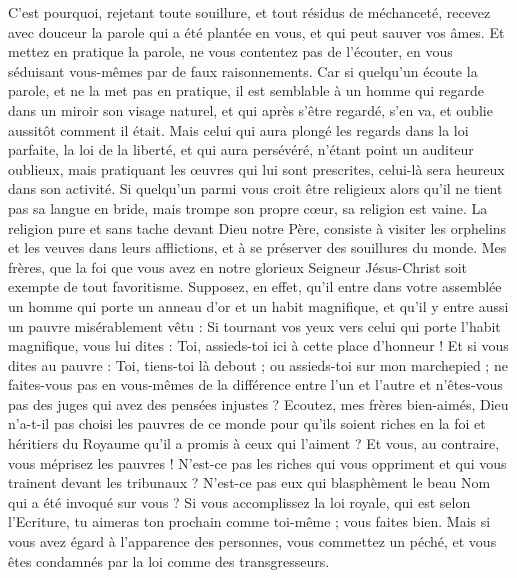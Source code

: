 \begin{multicols}{2}
C'est pourquoi, rejetant toute souillure, et tout résidus{} de méchanceté, recevez avec douceur la parole qui a été plantée en vous, et qui peut sauver vos âmes.
Et mettez en pratique la parole, ne vous contentez pas de l'écouter, en vous séduisant vous-mêmes par de faux raisonnements.
Car si quelqu'un écoute la parole, et ne la met pas en pratique, il est semblable à un homme qui regarde dans un miroir son visage naturel,
et qui après s'être regardé, s'en va, et oublie aussitôt comment il était.
Mais celui qui aura plongé les regards dans la loi parfaite, la loi de la liberté, et qui aura persévéré, n'étant point un auditeur oublieux, mais pratiquant les œuvres qui lui sont prescrites, celui-là sera heureux dans son activité.
Si quelqu'un parmi vous croit être religieux alors qu’il ne tient pas sa langue en bride, mais trompe son propre cœur, sa religion est vaine.
La religion pure et sans tache devant Dieu notre Père, consiste à visiter les orphelins et les veuves dans leurs afflictions, et à se préserver des souillures du monde.
\VerseOne{}Mes frères, que la foi que vous avez en notre glorieux Seigneur Jésus-Christ soit exempte de tout favoritisme.
Supposez, en effet, qu’il entre dans votre assemblée un homme qui porte un anneau d'or et un habit magnifique, et qu’il y entre aussi un pauvre misérablement vêtu :
Si tournant vos yeux vers celui qui porte l’habit magnifique, vous lui dites : Toi, assieds-toi ici à cette place d’honneur ! Et si vous dites au pauvre : Toi, tiens-toi là debout ; ou assieds-toi sur mon marchepied ;
ne faites-vous pas en vous-mêmes de la différence entre l’un et l’autre et n'êtes-vous pas des juges qui avez des pensées injustes ?
Ecoutez, mes frères bien-aimés, Dieu n'a-t-il pas choisi les pauvres de ce monde pour qu’ils soient riches en la foi et héritiers du Royaume qu'il a promis à ceux qui l'aiment ?
Et vous, au contraire, vous méprisez les pauvres ! N’est-ce pas les riches qui vous oppriment et qui vous trainent devant les tribunaux ?
N’est-ce pas eux qui blasphèment le beau Nom qui a été invoqué sur vous ?
Si vous accomplissez la loi royale, qui est selon l'Ecriture, tu aimeras ton prochain comme toi-même{} ; vous faites bien.
Mais si vous avez égard à l'apparence des personnes, vous commettez un péché, et vous êtes condamnés par la loi comme des transgresseurs.

\end{multicols}
